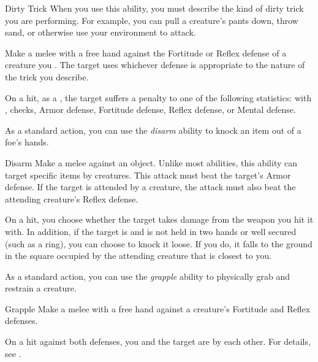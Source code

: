         \begin{freeability}{Dirty Trick}\label{Dirty Trick}
            When you use this ability, you must describe the kind of dirty trick you are performing.
            For example, you can pull a creature's pants down, throw sand, or otherwise use your environment to attack.

            Make a melee  with a free hand against the Fortitude or Reflex defense of a creature you .
            The target uses whichever defense is appropriate to the nature of the trick you describe.

            On a hit, as a , the target suffers a  penalty to one of the following statistics:
                 with ,  checks, Armor defense, Fortitude defense, Reflex defense, or Mental defense.
        \end{freeability}

         As a standard action, you can use the \textit{disarm} ability to knock an item out of a foe's hands.

        \begin{freeability}{Disarm}\label{Disarm}
            Make a melee  against an object.
            Unlike most abilities, this ability can target specific items  by creatures.
            This attack must beat the target's Armor defense.
            If the target is attended by a creature, the attack must also beat the attending creature's Reflex defense.

            On a hit, you choose whether the target takes damage from the weapon you hit it with.
            In addition, if the target is  and is not held in two hands or well secured (such as a ring), you can choose to knock it loose.
            If you do, it falls to the ground in the square occupied by the attending creature that is closest to you.
        \end{freeability}

         As a standard action, you can use the \textit{grapple} ability to physically grab and restrain a creature.

        \begin{freeability}{Grapple}\label{Grapple}
            Make a melee  with a free hand against a creature's Fortitude and Reflex defenses.

            On a hit against both defenses, you and the target are \grappled by each other.
            For details, see .
        \end{freeability}

